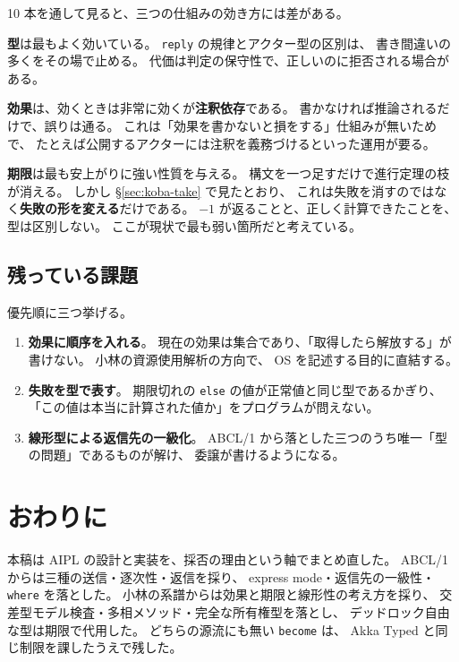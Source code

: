 \documentclass[11pt,a4paper]{ltjsarticle}
\theoremstyle{definition}
\theoremstyle{remark}
\begin{document}
10 本を通して見ると、三つの仕組みの効き方には差がある。

\textbf{型}は最もよく効いている。
\texttt{reply} の規律とアクター型の区別は、
書き間違いの多くをその場で止める。
代価は判定の保守性で、正しいのに拒否される場合がある。

\textbf{効果}は、効くときは非常に効くが\textbf{注釈依存}である。
書かなければ推論されるだけで、誤りは通る。
これは「効果を書かないと損をする」仕組みが無いためで、
たとえば公開するアクターには注釈を義務づけるといった運用が要る。

\textbf{期限}は最も安上がりに強い性質を与える。
構文を一つ足すだけで進行定理の枝が消える。
しかし \S\ref{sec:koba-take} で見たとおり、
これは失敗を消すのではなく\textbf{失敗の形を変える}だけである。
$-1$ が返ることと、正しく計算できたことを、型は区別しない。
ここが現状で最も弱い箇所だと考えている。

\subsection{残っている課題}

優先順に三つ挙げる。

\begin{enumerate}
\item \textbf{効果に順序を入れる}。
      現在の効果は集合であり、「取得したら解放する」が書けない。
      小林の資源使用解析の方向で、
      OS を記述する目的に直結する。
\item \textbf{失敗を型で表す}。
      期限切れの \texttt{else} の値が正常値と同じ型であるかぎり、
      「この値は本当に計算された値か」をプログラムが問えない。
\item \textbf{線形型による返信先の一級化}。
      ABCL/1 から落とした三つのうち唯一「型の問題」であるものが解け、
      委譲が書けるようになる。
\end{enumerate}

\section{おわりに}

本稿は AIPL の設計と実装を、採否の理由という軸でまとめ直した。
ABCL/1 からは三種の送信・逐次性・返信を採り、
express mode・返信先の一級性・\texttt{where} を落とした。
小林の系譜からは効果と期限と線形性の考え方を採り、
交差型モデル検査・多相メソッド・完全な所有権型を落とし、
デッドロック自由な型は期限で代用した。
どちらの源流にも無い \texttt{become} は、
Akka Typed と同じ制限を課したうえで残した。
\end{document}
